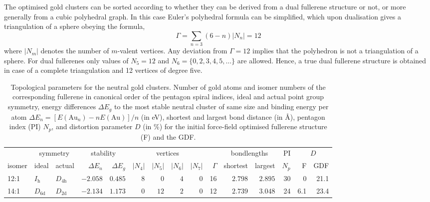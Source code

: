 The optimised gold clusters can be sorted according to whether they can be
derived from a dual fullerene structure or not, or more generally from a cubic
polyhedral graph. In this case Euler's polyhedral formula can be simplified,
which upon dualisation gives a triangulation of a sphere obeying the formula,
%
\begin{equation}
\label{eq3valent} 
\Gamma=\sum_{n=3}(6-n)|N_n| = 12
\end{equation}
%
where $|N_m|$ denotes the number of $m$-valent vertices. Any deviation from
$\Gamma=12$ implies that the polyhedron is not a triangulation of a sphere. For
dual fullerenes only values of $N_5=12$ and $N_6=\{0,2,3,4,5,\dots\}$ are
allowed. Hence, a true dual fullerene structure is obtained in case of a
complete triangulation and 12 vertices of degree five.
%
\begin{table}[htbp]
	\centering
    \setlength{\tabcolsep}{1.5pt}
    \footnotesize{
    \caption{Topological parameters for the neutral gold clusters. Number of
    gold atoms and isomer numbers of the corresponding fullerene in canonical
    order of the pentagon spiral indices,\autocite{Fowler-atlas-2006} ideal and
    actual point group symmetry, energy differences $\Delta E_g$ to the most
    stable neutral cluster of same size and binding energy per atom $\Delta E_n
    = [E(\textrm{Au}_n)-nE(\textrm{Au})]/n$  (in eV), shortest and largest bond
    distance (in \AA), pentagon index (PI) $N_p$, and distortion parameter $D$
    (in \%) for the initial force-field optimised fullerene structure (F) and
    the \acs{GDF}.}
	\label{tab:neutral}
	\begin{tabular}{lllrrrrrrrrrrrr}
\toprule
\multicolumn{1}{c}{  } & \multicolumn{2}{c}{ symmetry  }  & \multicolumn{2}{c}{stability} & \multicolumn{4}{c}{ vertices } & & \multicolumn{2}{c}{ bondlengths } &  PI & \multicolumn{2}{c}{ $D$ } \\
isomer & ideal  & actual  & $\Delta E_n$ &$\Delta E_g$ & \multicolumn{1}{c}{$|N_4|$} & \multicolumn{1}{c}{$|N_5|$} & \multicolumn{1}{c}{$|N_6|$} & \multicolumn{1}{c}{$|N_7|$} & $\Gamma$ & shortest & largest  & $N_p$ & F & GDF\\\midrule
12:1    & $I_\mathrm{h}$  & $D_\mathrm{4h}$ & $-2.058$ & $0.485$  & $8$ & $0$  & $4$      & $0$ & 16  & $2.798$ & $2.895$ & 30  & 0    & 21.1  \\
14:1    & $D_\mathrm{6d}$ & $D_\mathrm{2d}$ & $-2.134$ & $1.173$  & $0$ & $12$ & $2$      & $0$ & 12  & $2.739$ & $3.048$ & 24  & 6.1  & 23.4  \\

\end{tabular}}
\end{table}
